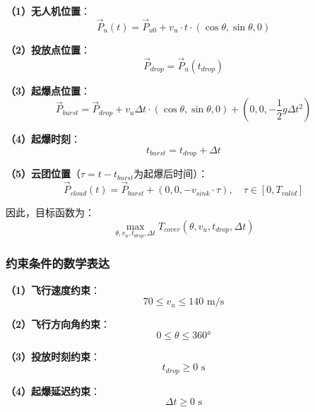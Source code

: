 \documentclass[12pt,a4paper]{article}
\begin{document}
\noindent\textbf{（1）无人机位置}：
\begin{equation}
\vec{P}_u(t) = \vec{P}_{u0} + v_u \cdot t \cdot (\cos\theta, \sin\theta, 0)
\end{equation}

\noindent\textbf{（2）投放点位置}：
\begin{equation}
\vec{P}_{drop} = \vec{P}_u(t_{drop})
\end{equation}

\noindent\textbf{（3）起爆点位置}：
\begin{equation}
\vec{P}_{burst} = \vec{P}_{drop} + v_u \Delta t \cdot (\cos\theta, \sin\theta, 0) + (0, 0, -\frac{1}{2}g\Delta t^2)
\end{equation}

\noindent\textbf{（4）起爆时刻}：
\begin{equation}
t_{burst} = t_{drop} + \Delta t
\end{equation}

\noindent\textbf{（5）云团位置}（$\tau = t - t_{burst}$为起爆后时间）：
\begin{equation}
\vec{P}_{cloud}(t) = \vec{P}_{burst} + (0, 0, -v_{sink} \cdot \tau), \quad \tau \in [0, T_{valid}]
\end{equation}

\indent 因此，目标函数为：
\begin{equation}
\max_{\theta, v_u, t_{drop}, \Delta t} T_{cover}(\theta, v_u, t_{drop}, \Delta t)
\end{equation}

\subsubsection{约束条件的数学表达}

\indent \textbf{（1）飞行速度约束}：
\begin{equation}
70 \leq v_u \leq 140 \text{ m/s}
\end{equation}

\indent \textbf{（2）飞行方向角约束}：
\begin{equation}
0 \leq \theta \leq 360°
\end{equation}

\indent \textbf{（3）投放时刻约束}：
\begin{equation}
t_{drop} \geq 0 \text{ s}
\end{equation}

\indent \textbf{（4）起爆延迟约束}：
\begin{equation}
\Delta t \geq 0 \text{ s}
\end{equation}
\end{document}
